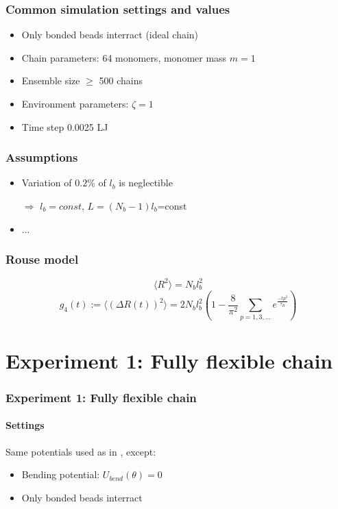 \documentclass[handout]{beamer}
\newcommand{\mean}[1]{\langle #1 \rangle}
\begin{document}
\begin{frame}
    \frametitle{Common simulation settings and values}

    \begin{itemize}
        \item Only bonded beads interract (ideal chain)
        \item Chain parameters: 64 monomers, monomer mass $m=1$
        \item Ensemble size $ \ge $ 500 chains
        \item Environment parameters: $\zeta=1$
        \item Time step 0.0025 LJ
    \end{itemize}

\end{frame}

\begin{frame}
    \frametitle{Assumptions}
    \begin{itemize}
        \item Variation of $0.2\%$ of $l_b$ is neglectible \cite{svaneborg_2020} 
        
        $\Rightarrow$ $l_b=const$, $L=(N_b-1) l_b$=const

        \item ...
    \end{itemize} 
\end{frame}


\begin{frame}
    \frametitle{Rouse model}
    \begin{equation}
        \mean{R^2}=N_b l_b^2
    \end{equation}
    \begin{equation}
        g_4(t) := \mean{(\Delta R(t))^2} = 2 N_b l_b^2 (1-\frac{8}{\pi^2}\sum_{p=1,3,...}e^{\frac{-t p^2}{\tau_R}})
    \end{equation}

\end{frame}

\section{Experiment 1: Fully flexible chain}


\begin{frame}
    \frametitle{Experiment 1: Fully flexible chain}
    \framesubtitle{Settings}
    Same potentials used as in \cite[Section 2.1]{svaneborg_2020}, except:
    \begin{itemize}
        \item Bending potential: $U_{bend}(\theta)=0$
        \item Only bonded beads interract
    \end{itemize}
\end{frame}
\end{document}
